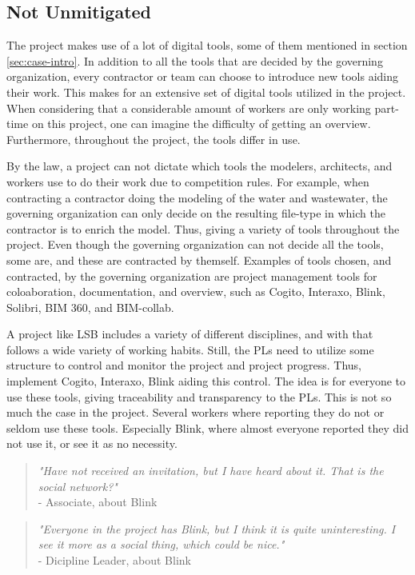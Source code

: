 \subsection{Not Unmitigated} \label{sec:unmitigated}
The project makes use of a lot of digital tools, some of them mentioned in section \ref{sec:case-intro}. In addition to all the tools that are decided by the governing organization, every contractor or team can choose to introduce new tools aiding their work. This makes for an extensive set of digital tools utilized in the project. When considering that a considerable amount of workers are only working part-time on this project, one can imagine the difficulty of getting an overview. Furthermore, throughout the project, the tools differ in use.  

By the law, a project can not dictate which tools the modelers, architects, and workers use to do their work due to competition rules. For example, when contracting a contractor doing the modeling of the water and wastewater, the governing organization can only decide on the resulting file-type in which the contractor is to enrich the model. Thus, giving a variety of tools throughout the project. Even though the governing organization can not decide all the tools, some are, and these are contracted by themself. Examples of tools chosen, and contracted, by the governing organization are project management tools for coloaboration, documentation, and overview, such as Cogito, Interaxo, Blink, Solibri, BIM 360, and BIM-collab.

A project like LSB includes a variety of different disciplines, and with that follows a wide variety of working habits. Still, the PLs need to utilize some structure to control and monitor the project and project progress. Thus, implement Cogito, Interaxo, Blink aiding this control. The idea is for everyone to use these tools, giving traceability and transparency to the PLs. This is not so much the case in the project. Several workers where reporting they do not or seldom use these tools. Especially Blink, where almost everyone reported they did not use it, or see it as no necessity. 

\begin{quote}
    \textit{"Have not received an invitation, but I have heard about it. That is the social network?"}\\
    - Associate, about Blink
\end{quote}

\begin{quote}
    \textit{"Everyone in the project has Blink, but I think it is quite uninteresting. I see it more as a social thing, which could be nice."}\\
    - Dicipline Leader, about Blink
\end{quote}

